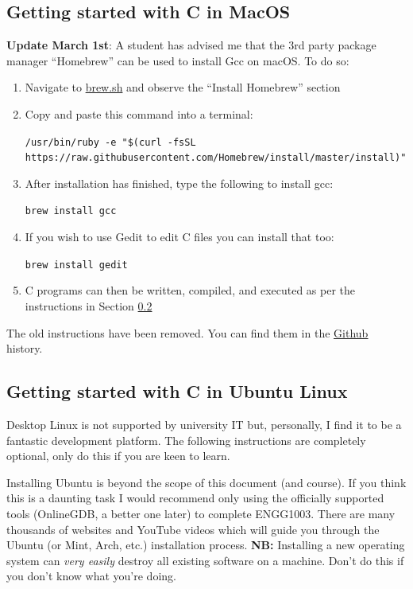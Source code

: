 \documentclass{lab}
\begin{document}
\subsection{Getting started with C in MacOS}

\textbf{Update March 1st}: A student has advised me that the 3rd party package manager ``Homebrew'' can be used to install Gcc on macOS. To do so:

\begin{enumerate}
\item Navigate to \href{https://brew.sh}{brew.sh} and observe the ``Install Homebrew'' section
\item Copy and paste this command into a terminal:

\footnotesize{\texttt{/usr/bin/ruby -e "\$(curl -fsSL https://raw.githubusercontent.com/Homebrew/install/master/install)"}}

\normalsize

\item After installation has finished, type the following to install gcc:

\texttt{brew install gcc}

\item If you wish to use Gedit to edit C files you can install that too:

\texttt{brew install gedit}

\item C programs can then be written, compiled, and executed as per the instructions in Section \ref{sec:ubuntu}

\end{enumerate}

The old instructions have been removed. You can find them in the \underline{\href{https://github.com/bschulznewy/engg1003/blob/dbd720e795fd030cd5e044b95b879bd406fd9702/Labs/LabWk1.pdf}{Github}} history.

\pagebreak
\subsection{Getting started with C in Ubuntu Linux}\label{sec:ubuntu}

Desktop Linux is not supported by university IT but, personally, I find it to be a fantastic development platform. The following instructions are completely optional, only do this if you are keen to learn.

Installing Ubuntu is beyond the scope of this document (and course). If you think this is a daunting task I would recommend only using the officially supported tools (OnlineGDB, a better one later) to complete ENGG1003. There are many thousands of websites and YouTube videos which will guide you through the Ubuntu (or Mint, Arch, etc.) installation process. \textbf{NB:} Installing a new operating system can \textit{very easily} destroy all existing software on a machine. Don't do this if you don't know what you're doing.
\end{document}
